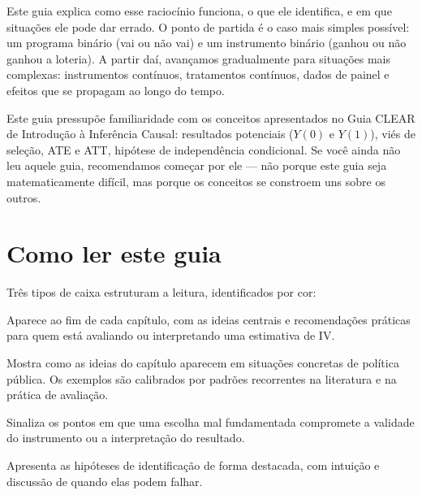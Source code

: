 \documentclass[12pt, a4paper, openany]{book}
\numberwithin{equation}{chapter}
\numberwithin{table}{chapter}
\numberwithin{figure}{chapter}
\begin{document}
Este guia explica como esse raciocínio funciona, o que ele identifica, e em que situações ele pode dar errado. O ponto de partida é o caso mais simples possível: um programa binário (vai ou não vai) e um instrumento binário (ganhou ou não ganhou a loteria). A partir daí, avançamos gradualmente para situações mais complexas: instrumentos contínuos, tratamentos contínuos, dados de painel e efeitos que se propagam ao longo do tempo.

\begin{conexaobox}
Este guia pressupõe familiaridade com os conceitos apresentados no Guia CLEAR de Introdução à Inferência Causal: resultados potenciais ($Y(0)$ e $Y(1)$), viés de seleção, ATE e ATT, hipótese de independência condicional. Se você ainda não leu aquele guia, recomendamos começar por ele --- não porque este guia seja matematicamente difícil, mas porque os conceitos se constroem uns sobre os outros.
\end{conexaobox}

\newpage

\thispagestyle{empty}
\section*{Como ler este guia}
Três tipos de caixa estruturam a leitura, identificados por cor:
\vspace{0.3cm}
\begin{notabox}
Aparece ao fim de cada capítulo, com as ideias centrais e recomendações práticas para quem está avaliando ou interpretando uma estimativa de IV.
\end{notabox}
\begin{exemplobox}
Mostra como as ideias do capítulo aparecem em situações concretas de política pública. Os exemplos são calibrados por padrões recorrentes na literatura e na prática de avaliação.
\end{exemplobox}
\begin{atencaobox}
Sinaliza os pontos em que uma escolha mal fundamentada compromete a validade do instrumento ou a interpretação do resultado.
\end{atencaobox}
\begin{hipotesebox}
Apresenta as hipóteses de identificação de forma destacada, com intuição e discussão de quando elas podem falhar.
\end{hipotesebox}
\end{document}
